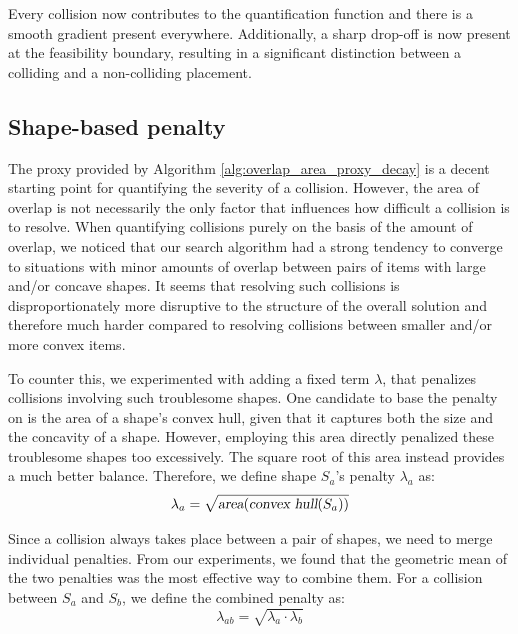 \documentclass[preprint, 11pt, authoryear]{elsarticle}
\begin{document}
Every collision now contributes to the quantification function and there is a smooth gradient present everywhere.
Additionally, a sharp drop-off is now present at the feasibility boundary, resulting in a significant distinction between a colliding and a non-colliding placement.

\subsection{Shape-based penalty}
The proxy provided by Algorithm \ref{alg:overlap_area_proxy_decay} is a decent starting point for quantifying the severity of a collision.
However, the area of overlap is not necessarily the only factor that influences how difficult a collision is to resolve.
When quantifying collisions purely on the basis of the amount of overlap, we noticed that our search algorithm had a strong tendency to converge to situations with minor amounts of overlap between pairs of items with large and/or concave shapes.
It seems that resolving such collisions is disproportionately more disruptive to the structure of the overall solution and therefore much harder compared to resolving collisions between smaller and/or more convex items.

To counter this, we experimented with adding a fixed term $\lambda$, that penalizes collisions involving such troublesome shapes.
One candidate to base the penalty on is the area of a shape's convex hull, given that it captures both the size and the concavity of a shape.
However, employing this area directly penalized these troublesome shapes too excessively. 
The square root of this area instead provides a much better balance. Therefore, we define shape $S_a$'s penalty $\lambda_{a}$ as:
\begin{equation} \label{eq:lambda}
    \lambda_{a} = \sqrt{\textsl{area}(\textsl{convex hull}(S_a))}
\end{equation}

Since a collision always takes place between a pair of shapes, we need to merge individual penalties.
From our experiments, we found that the geometric mean of the two penalties was the most effective way to combine them.
For a collision between $S_a$ and $S_b$, we define the combined penalty as:
\begin{equation} \label{eq:lambda_ab}
    \lambda_{ab} = \sqrt{\lambda_{a} \cdot \lambda_{b}}
\end{equation}


\end{document}
